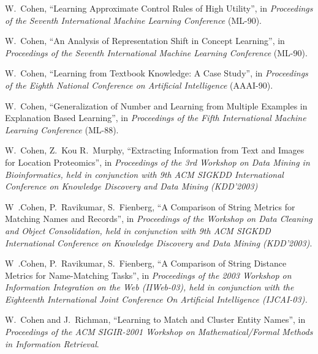 \item[1990]	W.~Cohen, ``Learning Approximate Control Rules of High
		Utility'', in {\em Proceedings of the Seventh
		International Machine Learning Conference} (ML-90). 

\item[1990]	W.~Cohen, ``An Analysis of Representation Shift in
		Concept Learning'', in {\em Proceedings of the Seventh
		International Machine Learning Conference} (ML-90).

\item[1990]	W.~Cohen, ``Learning from Textbook Knowledge: A Case Study'',
		in {\em Proceedings of the Eighth National Conference
		on Artificial Intelligence} (AAAI-90).

\item[1988]	W.~Cohen, ``Generalization of Number and Learning from
		Multiple Examples in Explanation Based Learning'',
		in {\em Proceedings of the Fifth International Machine
		Learning Conference} (ML-88).

\ed


\bd
\item[2003] W.~Cohen, Z.~Kou R.~Murphy,
	``Extracting Information from Text and Images for Location Proteomics'',
	in {\it Proceedings of the 3rd Workshop on Data Mining in Bioinformatics,
	held in conjunction with 9th ACM SIGKDD International Conference on Knowledge Discovery and Data Mining
		(KDD'2003)}

\item[2003]W~.Cohen, P.~Ravikumar, S.~Fienberg,
	``A Comparison of String Metrics for Matching Names and Records'',
	in {\it Proceedings of the Workshop on Data Cleaning and Object Consolidation,
	held in conjunction with 9th ACM SIGKDD International Conference on Knowledge Discovery and Data Mining
		(KDD'2003)}.

\item[2003]W~.Cohen, P.~Ravikumar, S.~Fienberg,
	``A Comparison of String Distance Metrics for Name-Matching
	Tasks'', in {\it Proceedings of the 2003 Workshop on
	Information Integration on the Web (IIWeb-03), held in
	conjunction with the Eighteenth International Joint Conference
	On Artificial Intelligence (IJCAI-03).}

\item[2001] W.~Cohen and J.~Richman, ``Learning to Match and Cluster Entity 
Names'', in {\em Proceedings of the ACM SIGIR-2001 Workshop on Mathematical/Formal Methods in
Information Retrieval}.

